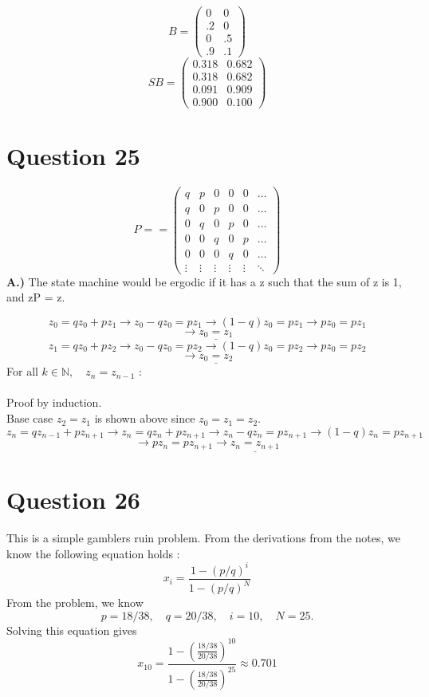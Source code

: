 \documentclass{article}
\begin{document}
   \[ B =\left(\begin{array}{rrrrr}
     0&0\\
   .2 & 0\\
   0 & .5\\
   .9 & .1 
     \end{array}\right)\]
     \[ SB =\left(\begin{array}{rrrrr} 
    0.318  & 0.682\\
   0.318  & 0.682\\
   0.091  & 0.909 \\
   0.900  & 0.100
          \end{array}\right)\]
\section*{Question 25}
\[P = =\left(\begin{array}{rrrrrr}
 q&p&0&0&0&\ldots\\
 q&0&p&0&0&\ldots\\
 0&q&0&p&0&\ldots\\
 0&0&q&0&p&\ldots\\
 0&0&0&q&0&\ldots\\
 \vdots&\vdots&\vdots&\vdots&\vdots&\ddots
\end{array}\right)\]
\textbf{A.)} The state machine would be ergodic if it has a z such that the sum
of z is 1, and zP = z. 

\[z_0 = qz_0 +pz_1 \longrightarrow z_0 - qz_0 = pz_1 \longrightarrow (1-q)z_0 =
pz_1 \longrightarrow pz_0 = pz_1 \]
\[\longrightarrow \underline{z_0 = z_1}\] 
\[z_1 = qz_0 + pz_2 \longrightarrow z_0 - qz_0 = pz_2  \longrightarrow (1-q)z_0 =
pz_2 \longrightarrow pz_0 = pz_2 \]
\[\longrightarrow \underline{z_0 = z_2}\] 
For all $k \in \mathbb{N},\quad z_n = z_{n-1}$ : 
\\
\\Proof by induction.
\\Base case $z_2 = z_1$ is shown above since $z_0 = z_1 = z_2$.
\[z_n = qz_{n-1} + pz_{n+1}  \longrightarrow z_n = qz_n + pz_{n+1}
\longrightarrow z_n - qz_n = pz_{n+1} \longrightarrow (1 - q)z_n = pz_{n+1} \]
\[ \longrightarrow pz_n = pz_{n+1}  \longrightarrow \underline {z_n = z_{n+1}}\]

\section*{Question 26} This is a simple gamblers ruin problem. From the derivations from the notes, we
know the following equation holds : 
\[ x_i = \frac{1 - (p/q)^i}{1 - (p/q)^N}\]
From the problem, we know
\[ p = 18/38,\quad q = 20/38,\quad i = 10,\quad N=25.\]
Solving this equation gives 
\[x_{10} = \frac{1 - (\frac{18/38}{20/38})^{10}}{1 - (\frac{18/38}{20/38})^{25}}
\approx 0.701 \] 
\end{document}
